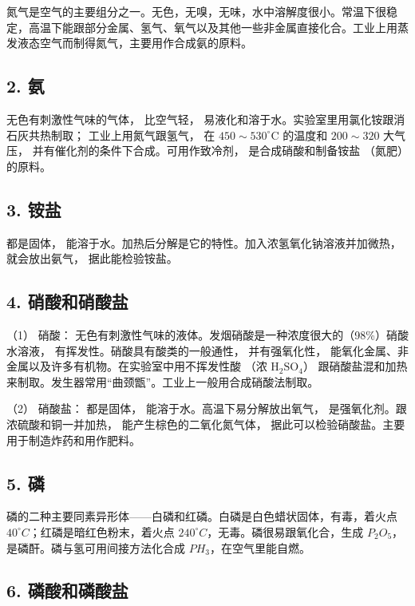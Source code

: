 氮气是空气的主要组分之一。无色，无嗅，无味，水中溶解度很小。常温下很稳定，高温下能跟部分金属、氢气、氧气以及其他一些非金属直接化合。工业上用蒸发液态空气而制得氮气，主要用作合成氨的原料。

\subsection{2. 氨}

无色有刺激性气味的气体， 比空气轻，
易液化和溶于水。实验室里用氯化铵跟消石灰共热制取； 工业上用氮气跟氢气，
在 \(450 \sim 530^{\circ} \mathrm{C}\) 的温度和 \(200 \sim 320\)
大气压， 并有催化剂的条件下合成。可用作致冷剂， 是合成硝酸和制备铵盐
（氮肥） 的原料。

\subsection{3. 铵盐}

都是固体， 能溶于水。加热后分解是它的特性。加入浓氢氧化钠溶液并加微热，
就会放出氨气， 据此能检验铵盐。

\subsection{4. 硝酸和硝酸盐}

（1） 硝酸：
无色有刺激性气味的液体。发烟硝酸是一种浓度很大的（98\%）硝酸水溶液，
有挥发性。硝酸具有酸类的一般通性， 并有强氧化性，
能氧化金属、非金属以及许多有机物。在实验室中用不挥发性酸 （浓
\(\mathrm{H}_{2} \mathrm{SO}_{4}\)）
跟硝酸盐混和加热来制取。发生器常用``曲颈甑''。工业上一般用合成硝酸法制取。

（2） 硝酸盐： 都是固体， 能溶于水。高温下易分解放出氧气，
是强氧化剂。跟浓硫酸和铜一并加热， 能产生棕色的二氧化氮气体，
据此可以检验硝酸盐。主要用于制造炸药和用作肥料。

\subsection{5. 磷}

磷的二种主要同素异形体------白磷和红磷。白磷是白色蜡状固体，有毒，着火点
\(40^{\circ}C\)；红磷是暗红色粉末，着火点
\(240^{\circ}C\)，无毒。磷很易跟氧化合，生成
\(P_{2}O_{5}\)，是磷酐。磷与氢可用间接方法化合成
\(PH_{3}\)，在空气里能自燃。

\subsection{6. 磷酸和磷酸盐}

